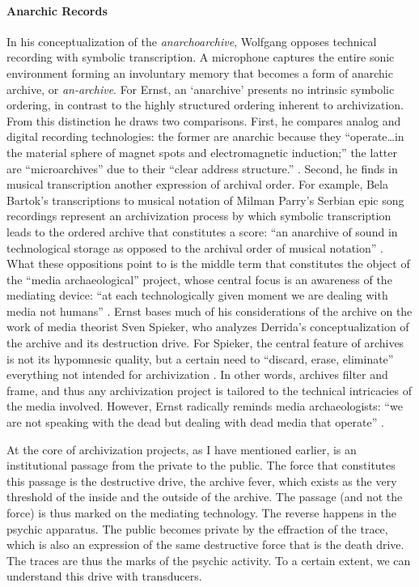 
\paragraph{Anarchic Records}
In his conceptualization of the \textit{anarchoarchive}, Wolfgang \textcite{Ern13:Dig} opposes technical recording with symbolic transcription. A microphone captures the entire sonic environment forming an involuntary memory that becomes a form of anarchic archive, or \textit{an-archive}. For Ernst, an `anarchive' presents no intrinsic symbolic ordering, in contrast to the highly structured ordering inherent to archivization. From this distinction he draws two comparisons. First, he compares analog and digital recording technologies: the former are anarchic because they ``operate\dots in the material sphere of magnet spots and electromagnetic induction;'' the latter are ``microarchives'' due to their ``clear address structure.'' \textcite[92]{Ern13:Dig}. Second, he finds in musical transcription another expression of archival order. For example, Bela Bartok's transcriptions to musical notation of Milman Parry's Serbian epic song recordings represent an archivization process by which symbolic transcription leads to the ordered archive that constitutes a score: ``an anarchive of sound in technological storage as opposed to the archival order of musical notation'' \parencite[174]{Ern13:Dig}. What these oppositions point to is the middle term that constitutes the object of the ``media archaeological'' project, whose central focus is an awareness of the mediating device: ``at each technologically given moment we are dealing with media not humans'' \parencite[183]{Ern13:Dig}. Ernst bases much of his considerations of the archive on the work of media theorist Sven Spieker, who analyzes Derrida's conceptualization of the archive and its destruction drive. For Spieker, the central feature of archives is not its hypomnesic quality, but a certain need to ``discard, erase, eliminate'' everything not intended for archivization \parencite[113]{Ern13:Dig}. In other words, archives filter and frame, and thus any archivization project is tailored to the technical intricacies of the media involved. However, Ernst radically reminds media archaeologists: ``we are not speaking with the dead but dealing with dead media that operate'' \parencite[183]{Ern13:Dig}.   

At the core of archivization projects, as I have mentioned earlier, is an institutional passage from the private to the public. The force that constitutes this passage is the destructive drive, the archive fever, which exists as the very threshold of the inside and the outside of the archive. The passage (and not the force) is thus marked on the mediating technology. The reverse happens in the psychic apparatus. The public becomes private by the effraction of the trace, which is also an expression of the same destructive force that is the death drive. The traces are thus the marks of the psychic activity. To a certain extent, we can understand this drive with transducers.

